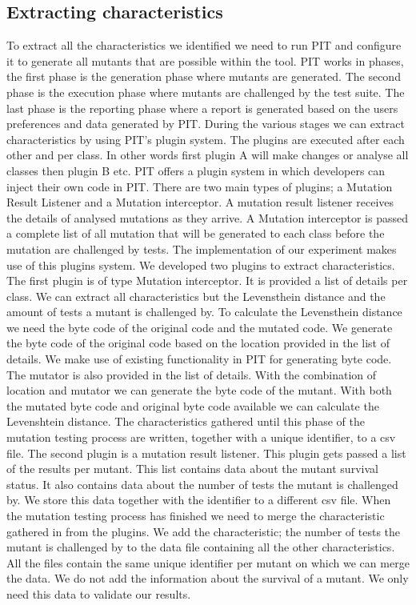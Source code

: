 \documentclass[../../main]{subfiles}
\begin{document}
\subsection{Extracting characteristics}
To extract all the characteristics we identified we need to run PIT and configure it to generate all mutants that are possible within the tool. 
PIT works in phases, the first phase is the generation phase where mutants are generated.
The second phase is the execution phase where mutants are challenged by the test suite.
The last phase is the reporting phase where a report is generated based on the users preferences and data generated by PIT.
During the various stages we can extract characteristics by using PIT's plugin system.
The plugins are executed after each other and per class.
In other words first plugin A will make changes or analyse all classes then plugin B etc.
\newline
PIT offers a plugin system in which developers can inject their own code in PIT\cite{pitestPlugin}.
There are two main types of plugins; a Mutation Result Listener and a Mutation interceptor\cite{pitestPlugin}.
A mutation result listener receives the details of analysed mutations as they arrive\cite{pitestPlugin}.
A Mutation interceptor is passed a complete list of all mutation that will be generated to each class before the mutation are challenged by tests\cite{pitestPlugin}.
The implementation of our experiment makes use of this plugins system.
\newline
We developed two plugins to extract characteristics.
The first plugin is of type Mutation interceptor.
It is provided a list of details per class. 
We can extract all characteristics but the Levensthein distance and the amount of tests a mutant is challenged by.
To calculate the Levensthein distance we need the byte code of the original code and the mutated code.
We generate the byte code of the original code based on the location provided in the list of details.
We make use of existing functionality in PIT for generating byte code.
The mutator is also provided in the list of details.
With the combination of location and mutator we can generate the byte code of the mutant.
With both the mutated byte code and original byte code available we can calculate the Levenshtein distance.
\newline
The characteristics gathered until this phase of the mutation testing process are written, together with a unique identifier, to a \acrshort{csv} file.
\newline
The second plugin is a mutation result listener. 
This plugin gets passed a list of the results per mutant.
This list contains data about the mutant survival status.
It also contains data about the number of tests the mutant is challenged by.
We store this data together with the identifier to a different \acrshort{csv} file.
\newline
When the mutation testing process has finished we need to merge the characteristic gathered in from the plugins.
We add the characteristic; the number of tests the mutant is challenged by to the data file containing all the other characteristics.
All the files contain the same unique identifier per mutant on which we can merge the data.
We do not add the information about the survival of a mutant.
We only need this data to validate our results. 
\end{document}
